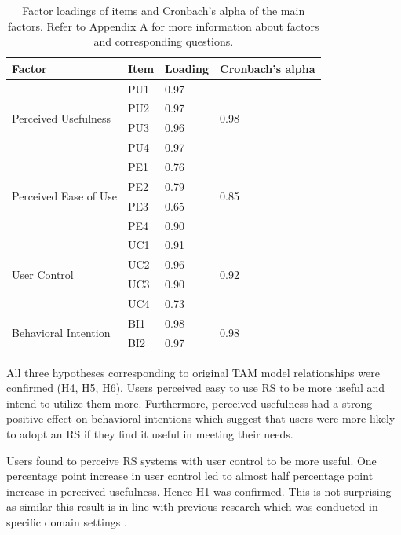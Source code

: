 \documentclass[a4paper,12pt]{article}
\begin{document}
\begin{table}[ht]
\centering
\begin{tabular}{llll}
\hline
\textbf{Factor}             & \textbf{Item} & \textbf{Loading} & \textbf{Cronbach's alpha} \\ \hline
\multirow{4}{*}{Perceived Usefulness} & PU1   & 0.97 & \multirow{4}{*}{0.98}  \\
                             & PU2   & 0.97  \\
                             & PU3   & 0.96  \\
                             & PU4   & 0.97   \\ \hline
\multirow{4}{*}{Perceived Ease of Use} & PE1   & 0.76 & \multirow{4}{*}{0.85} \\
                             & PE2   & 0.79  \\
                             & PE3   & 0.65  \\
                             & PE4   & 0.90  \\ \hline
\multirow{4}{*}{User Control} & UC1   & 0.91  & \multirow{4}{*}{0.92} \\
                             & UC2   & 0.96  \\
                             & UC3   & 0.90  \\
                             & UC4   & 0.73  \\ \hline
\multirow{2}{*}{Behavioral Intention} & BI1   & 0.98  & \multirow{2}{*}{0.98} \\
                             & BI2   & 0.97  \\ \hline
\end{tabular}
\caption[Factor loadings of items]{Factor loadings of items and Cronbach's alpha of the main factors. Refer to Appendix A for more information about factors and corresponding questions.}
\label{tab:factorloadings}
\end{table}

All three hypotheses corresponding to original TAM model relationships were confirmed (H4, H5, H6). Users perceived easy to use RS to be more useful and intend to utilize them more.  Furthermore, perceived usefulness had a strong positive effect on behavioral intentions which suggest that users were more likely to adopt an RS if they find it useful in meeting their needs.

Users found to perceive RS systems with user control to be more useful. One percentage point increase in user control led to almost half percentage point increase in perceived usefulness. Hence H1 was confirmed. This is not surprising as similar this result is in line with previous research which was conducted in specific domain settings \citep{bostandjiev2012tasteweights, millecampControllingSpotifyRecommendations2018}. 
\end{document}

